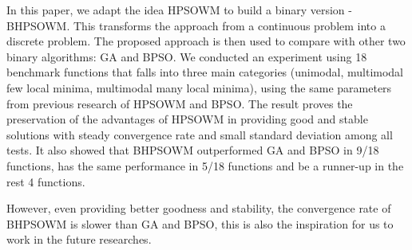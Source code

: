 In this paper, we adapt the idea HPSOWM to build a binary version - BHPSOWM. This transforms the approach from a continuous problem into a discrete problem. The proposed approach is then used to compare with other two binary algorithms: GA and BPSO. We conducted an experiment using 18 benchmark functions that falls into three main categories (unimodal, multimodal few local minima, multimodal many local minima), using the same parameters from previous research of HPSOWM and BPSO. The result proves the preservation of the advantages of HPSOWM in providing good and stable solutions with steady convergence rate and small standard deviation among all tests. It also showed that BHPSOWM outperformed GA and BPSO in 9/18 functions, has the same performance in 5/18 functions and be a runner-up in the rest 4 functions.

However, even providing better goodness and stability, the convergence rate of BHPSOWM is slower than GA and BPSO, this is also the inspiration for us to work in the future researches.